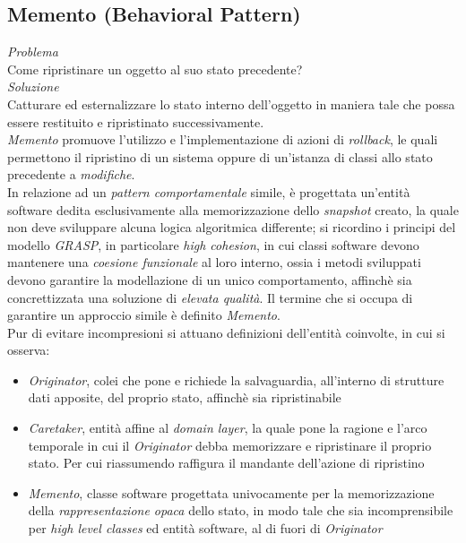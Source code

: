 \documentclass{article}
\begin{document}
\subsection*{Memento (Behavioral Pattern)}
\large
\textit{Problema}\\
Come ripristinare un oggetto al suo stato precedente?\vspace*{14pt}\\
\textit{Soluzione}\\
Catturare ed esternalizzare lo stato interno dell'oggetto in maniera tale che possa essere restituito e ripristinato successivamente.\vspace*{14pt}\\
\textit{Memento} promuove l'utilizzo e l'implementazione di azioni di \textit{rollback}, le quali permettono il ripristino di un sistema oppure di un'istanza di classi allo stato precedente a \textit{modifiche}.\vspace*{7pt}\\
In relazione ad un \textit{pattern comportamentale} simile, è progettata un'entità software dedita esclusivamente alla memorizzazione dello \textit{snapshot} creato, la quale non deve sviluppare alcuna logica algoritmica differente; si ricordino i principi del modello \textit{GRASP}, in particolare \textit{high cohesion}, in cui classi software devono mantenere una \textit{coesione funzionale} al loro interno, ossia i metodi sviluppati devono garantire la modellazione di un unico comportamento, affinchè sia concrettizzata una soluzione di \textit{elevata qualità}. Il termine che si occupa di garantire un approccio simile è definito \textit{Memento}.\vspace*{7pt}\\
Pur di evitare incompresioni si attuano definizioni dell'entità coinvolte, in cui si osserva:
\begin{itemize}[label={-}]
    \itemsep0em
    \item \textit{Originator}, colei che pone e richiede la salvaguardia, all'interno di strutture dati apposite, del proprio stato, affinchè sia ripristinabile 
    \item \textit{Caretaker}, entità affine al \textit{domain layer}, la quale pone la ragione e l'arco temporale in cui il \textit{Originator} debba memorizzare e ripristinare il proprio stato. Per cui riassumendo raffigura il mandante dell'azione di ripristino
    \item \textit{Memento}, classe software progettata univocamente per la memorizzazione della \textit{rappresentazione opaca} dello stato, in modo tale che sia incomprensibile per \textit{high level classes} ed entità software, al di fuori di \textit{Originator} 
\end{itemize}
\end{document}
